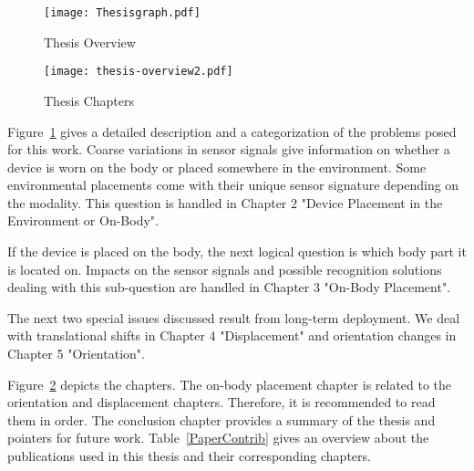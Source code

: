 \begin{figure}[t]
 \begin{center}
 \texttt{[image: Thesisgraph.pdf]}
	\end{center}
 \caption[Thesis overview graph]{Thesis Overview}
\label{fig:graph}
\end{figure}

\begin{figure}[t]
 \begin{center}
 \texttt{[image: thesis-overview2.pdf]}
	\end{center}
 \caption[Thesis chapters]{Thesis Chapters}
\label{fig:chapters}
\end{figure}

Figure~\ref{fig:graph} gives a detailed description and a categorization of the problems
posed for this work. Coarse variations in sensor signals give information
on whether a device is worn on the body or placed somewhere in the environment. 
Some environmental placements come with their unique sensor signature
depending on the modality. This question is handled in Chapter 2
"Device Placement in the Environment or On-Body". 

If the device is placed on the body, the next logical question is
which body part it is located on.  Impacts on the sensor signals and possible
recognition solutions dealing with this sub-question are handled 
in Chapter 3 "On-Body Placement".

The next two special issues discussed result from long-term deployment.
We deal with translational shifts in Chapter 4 "Displacement" and
orientation changes in Chapter 5 "Orientation".

Figure~\ref{fig:chapters} depicts the chapters.  
The on-body placement chapter is related to the  orientation and displacement chapters.
Therefore, it is recommended to read them in order. 
The conclusion chapter provides a summary of the thesis
and pointers for future work. Table~\ref{PaperContrib} gives an overview 
about the publications used in this thesis and their corresponding chapters.

